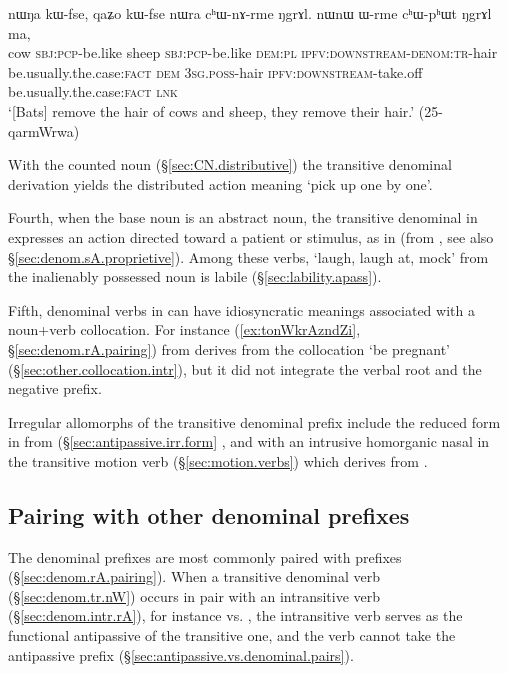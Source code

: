 \begin{exe}
\ex \label{ex:chWnArme}
\gll  nɯŋa kɯ-fse, qaʑo kɯ-fse nɯra cʰɯ-nɤ-rme ŋgrɤl. nɯnɯ ɯ-rme cʰɯ-pʰɯt ŋgrɤl ma, \\
cow \textsc{sbj}:\textsc{pcp}-be.like sheep \textsc{sbj}:\textsc{pcp}-be.like \textsc{dem}:\textsc{pl} \textsc{ipfv}:\textsc{downstream}-\textsc{denom}:\textsc{tr}-hair be.usually.the.case:\textsc{fact} \textsc{dem} \textsc{3sg}.\textsc{poss}-hair \textsc{ipfv}:\textsc{downstream}-take.off  be.usually.the.case:\textsc{fact} \textsc{lnk} \\
\glt `[Bats] remove the hair of cows and sheep, they remove their hair.' (25-qarmWrwa)
\end{exe}

With the counted noun  (§\ref{sec:CN.distributive}) the transitive denominal derivation  yields the distributed action meaning  `pick up one by one'.

Fourth, when the base noun is an abstract noun, the transitive denominal in  expresses an action directed toward a patient or stimulus, as in  (from 
, see also §\ref{sec:denom.sA.proprietive}). Among these verbs,  `laugh, laugh at, mock' from the inalienably possessed noun  is labile (§\ref{sec:lability.apass}).


  
Fifth, denominal verbs in  can have idiosyncratic meanings associated with a noun+verb collocation. For instance  (\ref{ex:tonWkrAzndZi}, §\ref{sec:denom.rA.pairing}) from   derives from the collocation  `be pregnant' (§\ref{sec:other.collocation.intr}), but it did not integrate the verbal root  and the negative prefix.

Irregular allomorphs of the transitive denominal  prefix include the reduced form  in  from  (§\ref{sec:antipassive.irr.form} , and  with an intrusive homorganic nasal in the transitive motion verb  (§\ref{sec:motion.verbs}) which derives from .

\subsection{Pairing with other denominal prefixes}  \label{sec:denom.nW.pairing}
The   denominal prefixes are most commonly paired with  prefixes (§\ref{sec:denom.rA.pairing}). When a transitive  denominal verb (§\ref{sec:denom.tr.nW}) occurs in pair with an intransitive   verb (§\ref{sec:denom.intr.rA}), for instance   vs. , the intransitive verb serves as the functional antipassive of the transitive one, and the  verb cannot take the antipassive  prefix (§\ref{sec:antipassive.vs.denominal.pairs}).

